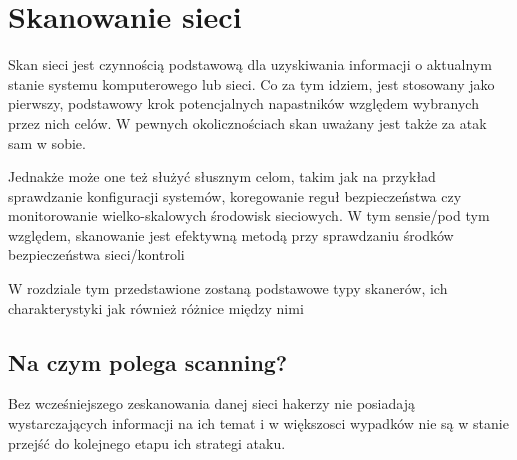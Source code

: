 \chapter{Skanowanie sieci}
\label{cha:scan}



Skan sieci \cite{Cheng2011} jest czynnością podstawową dla uzyskiwania informacji o aktualnym stanie systemu komputerowego lub sieci. Co za tym idziem, jest stosowany jako pierwszy, podstawowy krok potencjalnych napastników względem wybranych przez nich celów. W pewnych okolicznościach skan uważany jest także za atak sam w sobie. 

Jednakże może one też służyć słusznym celom, takim jak na przykład sprawdzanie konfiguracji systemów, koregowanie reguł bezpieczeństwa czy monitorowanie wielko-skalowych środowisk sieciowych. W tym sensie/pod tym względem, skanowanie jest efektywną metodą przy sprawdzaniu środków bezpieczeństwa sieci/kontroli

W rozdziale tym przedstawione zostaną podstawowe typy skanerów, ich charakterystyki jak również różnice między nimi

\section{Na czym polega scanning?}

Bez wcześniejszego zeskanowania danej sieci hakerzy nie posiadają wystarczających informacji na ich temat i w większosci wypadków nie są w stanie przejść do kolejnego etapu ich strategi ataku.

